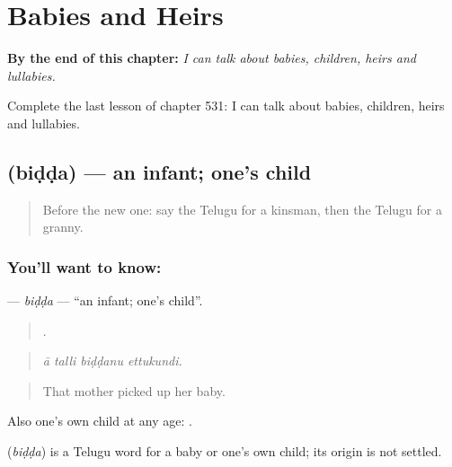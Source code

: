 
\chapter{Babies and Heirs}
\label{ch:te-babies-and-heirs}

\begin{chapteropening}
\textbf{By the end of this chapter:} \emph{I can talk about babies, children, heirs and lullabies.}

Complete the last lesson of chapter 531: I can talk about babies, children, heirs and lullabies.
\end{chapteropening}

\section[\texorpdfstring{\te{బిడ్డ} (biḍḍa)}{బిడ్డ (biḍḍa)}]{ (biḍḍa) — an infant; one's child}

\label{lesson:TE-C531-bidda}



\begin{quote}
Before the new one: say the Telugu for a kinsman, then the Telugu for a granny.
\end{quote}

\subsection*{You'll want to know: }
\textbf{} — \emph{biḍḍa} — \textquotedblleft{}an infant; one's child\textquotedblright{}.

\begin{quote}
   .
\end{quote}

\begin{quote}
\emph{ā talli biḍḍanu ettukundi.}
\end{quote}

\begin{quote}
That mother picked up her baby.
\end{quote}

Also one's own child at any age:  .

\begin{cousinweb}
\textbf{} (\emph{biḍḍa}) is a Telugu word for a baby or one's own child; its origin is not settled.
\end{cousinweb}

